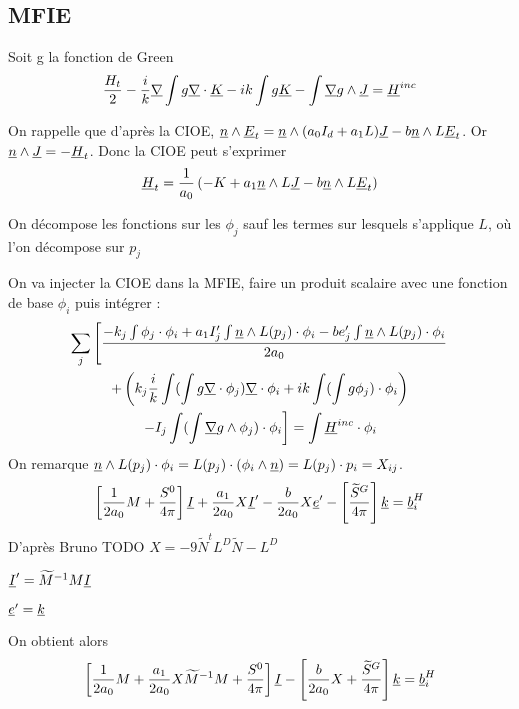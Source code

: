 \subsection{MFIE}
Soit g la fonction de Green
\[
  \dfrac{H_t}{2}-\dfrac{i}{k}\underline{\nabla} \int  g\underline{\nabla} \cdot\underline{K} -  ik\int g\underline{K} - \int \underline{\nabla} g \wedge \underline{J} = \underline{H}^{inc}
\]

On rappelle que d’après la CIOE, $\underline{n} \wedge \underline{E}_t = \underline{n} \wedge (a_0I_d+a_1L)\underline{J} -b\underline{n}\wedge L\underline{E}_t$. Or $\underline{n}\wedge \underline{J} = -\underline{H}_t$. Donc la CIOE peut s'exprimer
\[
  \underline{H}_t = \dfrac{1}{a_0}\left(-K + a_1 \underline{n}\wedge L\underline{J} -b\underline{n}\wedge L\underline{E}_t\right)
\]

On décompose les fonctions sur les $\phi_j$ sauf les termes sur lesquels s'applique $L$, où l'on décompose sur $p_j$ 

On va injecter la CIOE dans la MFIE, faire un produit scalaire avec une fonction de base $\phi_i$ puis intégrer : 
\begin{multline}
  \sum_j \left [\dfrac{-k_j\int\phi_j\cdot\phi_i + a_1 I'_j \int \underline{n} \wedge L (p_j) \cdot \phi_i  -be'_j\int \underline{n} \wedge L(p_j)\cdot \phi_i}{2a_0} \right. \\
  +\left(k_j\dfrac{i}{k}\int (\int g\underline{\nabla} \cdot\phi_j)\underline{\nabla} \cdot \phi_i + ik\int (\int g\phi_j)\cdot \phi_i \right)\\
  \left. -  I_j\int(\int \underline{\nabla} g \wedge \phi_j) \cdot \phi_i \right]= \int \underline{H}^{inc} \cdot \phi_i
\end{multline}
On remarque $ \underline{n} \wedge L(p_j)\cdot \phi_i = L(p_j)\cdot(\phi_i\wedge\underline{n}) = L(p_j)\cdot p_i = X_{ij}$. 
\[
  \left[\dfrac{1}{2a_0}M + \dfrac{S^0}{4\pi}\right]\underline{I} + \dfrac{a_1}{2a_0}X\underline{I}' - \dfrac{b}{2a_0}X\underline{e}' - \left[ \dfrac{\widetilde{S}^G}{4\pi}\right]\underline{k} = \underline{b}_i^H
\]
D’après Bruno TODO $X = -9\tilde N^tL^D\tilde N - L^D$ %

$\underline{I}' = \widetilde{M}^{-1}M\underline{I}$

$\underline{e}' = \underline{k}$

On obtient alors 
\[
  \left[\dfrac{1}{2a_0}M + \dfrac{a_1}{2a_0}X\widetilde{M}^{-1}M + \dfrac{S^0}{4\pi}\right]\underline{I} - \left[\dfrac{b}{2a_0}X+ \dfrac{\widetilde{S}^G}{4\pi}\right]\underline{k} = \underline{b}_i^H
\]

